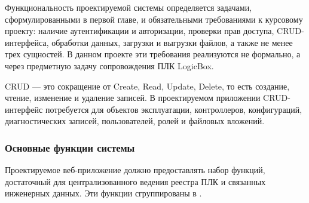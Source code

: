Функциональность проектируемой системы определяется задачами, сформулированными
в первой главе, и обязательными требованиями к курсовому проекту: наличие
аутентификации и авторизации, проверки прав доступа, CRUD-интерфейса,
обработки данных, загрузки и выгрузки файлов, а также не менее трех сущностей.
В данном проекте эти требования реализуются не формально, а через предметную
задачу сопровождения ПЛК LogicBox.

CRUD --- это сокращение от Create, Read, Update, Delete, то есть создание,
чтение, изменение и удаление записей. В проектируемом приложении CRUD-интерфейс
потребуется для объектов эксплуатации, контроллеров, конфигураций,
диагностических записей, пользователей, ролей и файловых вложений.

\subsubsection{Основные функции системы}

Проектируемое веб-приложение должно предоставлять набор функций, достаточный
для централизованного ведения реестра ПЛК и связанных инженерных данных. Эти
функции сгруппированы в .

